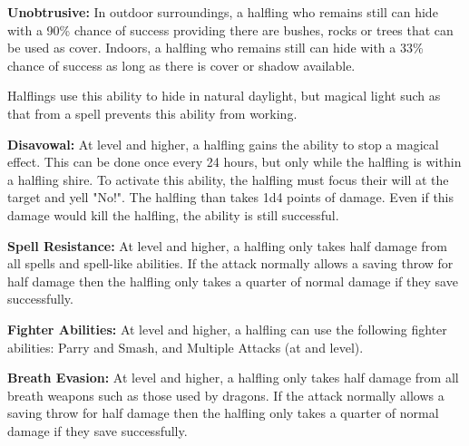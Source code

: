 \begin{multicols*}{2}
\textbf{Unobtrusive:} In outdoor surroundings, a halfling who remains still can hide with a 90\% chance of success providing there are bushes, rocks or trees that can be used as cover. Indoors, a halfling who remains still can hide with a 33\% chance of success as long as there is cover or shadow available.

Halflings use this ability to hide in natural daylight, but magical light such as that from a  spell prevents this ability from working.

\textbf{Disavowal:} At  level and higher, a halfling gains the ability to stop a magical effect. This can be done once every 24 hours, but only while the halfling is within a halfling shire. To activate this ability, the halfling must focus their will at the target and yell "No!". The halfling than takes 1d4 points of damage. Even if this damage would kill the halfling, the ability is still successful.

\textbf{Spell Resistance:} At  level and higher, a halfling only takes half damage from all spells and spell-like abilities. If the attack normally allows a saving throw for half damage then the halfling only takes a quarter of normal damage if they save successfully.

\textbf{Fighter Abilities:} At  level and higher, a halfling can use the following fighter abilities: Parry and Smash, and Multiple Attacks (at  and  level).

\textbf{Breath Evasion:} At  level and higher, a halfling only takes half damage from all breath weapons such as those used by dragons. If the attack normally allows a saving throw for half damage then the halfling only takes a quarter of normal damage if they save successfully.


\end{multicols*}
